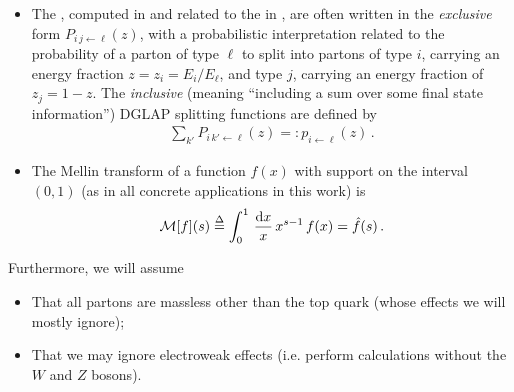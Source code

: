 \begin{itemize}
    \item
        The , computed in  and related to the  in , are often written in the \emph{exclusive} form \(P_{i\,j \leftarrow \ell}(z)\), with a probabilistic interpretation related to the probability of a parton of type \(\ell\) to split into partons of type \(i\), carrying an energy fraction \(z = z_i = E_i / E_\ell\), and type \(j\), carrying an energy fraction of \(z_j = 1-z\).
        The \emph{inclusive} (meaning ``including a sum over some final state information'') DGLAP splitting functions are defined by
        \begin{align}
            \sum_{k'} P_{i\,k' \leftarrow \ell}(z) =: p_{i\leftarrow \ell}(z)
            \,.
        \end{align}


    \item
        The Mellin transform of a function \(f(x)\) with support on the interval \((0,1)\) (as in all concrete applications in this work) is
        \begin{align}
            \mathcal{M}[f](s)
            \overset{\Delta}{=}
            \int_0^1 \,\frac{\dd x}{x}\, x^{s-1} \, f(x)
            =
            \hat f(s)
            \,.
        \end{align}

\end{itemize}


Furthermore, we will assume
\begin{itemize}
    \item
    That all partons are massless other than the top quark (whose effects we will mostly ignore);

    \item
    That we may ignore electroweak effects (i.e. perform calculations without the \(W\) and \(Z\) bosons).
\end{itemize}
